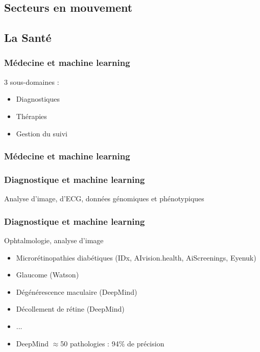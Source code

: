 \subsection{Secteurs en mouvement}
\subsection{La Santé}

\begin{frame}
  \frametitle{Médecine et machine learning}
  3 sous-domaines :
  \begin{itemize}
  \item Diagnostiques
  \item Thérapies
  \item Gestion du suivi
  \end{itemize}
\end{frame}

\begin{frame}
  \frametitle{Médecine et machine learning}
\end{frame}

\begin{frame}
  \frametitle{Diagnostique et machine learning}
  Analyse d'image, d'ECG, données génomiques et phénotypiques
\end{frame}

\begin{frame}
  \frametitle{Diagnostique et machine learning}
  Ophtalmologie, analyse d'image
  \newline
  \newline
  \begin{minipage}[c]{0.65\linewidth}
    \begin{itemize}
    \item Microrétinopathies diabétiques (IDx, AIvision.health, AiScreenings, Eyenuk)
    \item Glaucome (Watson)
    \item Dégénérescence maculaire (DeepMind)
    \item Décollement de rétine (DeepMind)
    \item ...
    \item DeepMind $\approx$50 pathologies : 94\% de précision
    \end{itemize}
  \end{minipage}\hfill
  \begin{minipage}[c]{0.34\linewidth}
  \end{minipage}\hfill
\end{frame}


